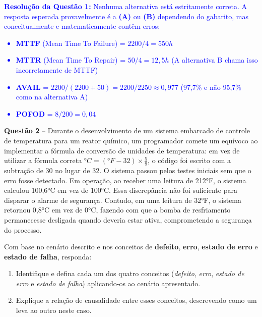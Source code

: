 \documentclass[12pt,a4paper]{article}
\begin{document}
\vspace{0.3cm}
\noindent\textcolor{blue}{\textbf{Resolução da Questão 1:} Nenhuma alternativa está estritamente correta. A resposta esperada provavelmente é a \textbf{(A)} ou \textbf{(B)} dependendo do gabarito, mas conceitualmente e matematicamente contêm erros:
\begin{itemize}
    \item \textbf{MTTF} (Mean Time To Failure) = $2200 / 4 = 550h$
    \item \textbf{MTTR} (Mean Time To Repair) = $50 / 4 = 12,5h$ (A alternativa B chama isso incorretamente de MTTF)
    \item \textbf{AVAIL} = $2200 / (2200 + 50) = 2200 / 2250 \approx 0,977$ (97,7\% e não 95,7\% como na alternativa A)
    \item \textbf{POFOD} = $8 / 200 = 0,04$
\end{itemize}
}

\vspace{0.5cm}

\textbf{Questão 2} -- Durante o desenvolvimento de um sistema embarcado de controle de temperatura para um reator químico, um programador comete um equívoco ao implementar a fórmula de conversão de unidades de temperatura: em vez de utilizar a fórmula correta $°C = (°F - 32) \times \frac{5}{9}$, o código foi escrito com a subtração de 30 no lugar de 32. O sistema passou pelos testes iniciais sem que o erro fosse detectado. Em operação, ao receber uma leitura de 212°F, o sistema calculou 100,6°C em vez de 100°C. Essa discrepância não foi suficiente para disparar o alarme de segurança. Contudo, em uma leitura de 32°F, o sistema retornou 0,8°C em vez de 0°C, fazendo com que a bomba de resfriamento permanecesse desligada quando deveria estar ativa, comprometendo a segurança do processo.

\vspace{0.2cm}

Com base no cenário descrito e nos conceitos de \textbf{defeito}, \textbf{erro}, \textbf{estado de erro} e \textbf{estado de falha}, responda:

\begin{enumerate}[label=\textbf{\alph*)}]
    \item Identifique e defina cada um dos quatro conceitos (\textit{defeito}, \textit{erro}, \textit{estado de erro} e \textit{estado de falha}) aplicando-os ao cenário apresentado.
    \item Explique a relação de causalidade entre esses conceitos, descrevendo como um leva ao outro neste caso.
\end{enumerate}
\end{document}
